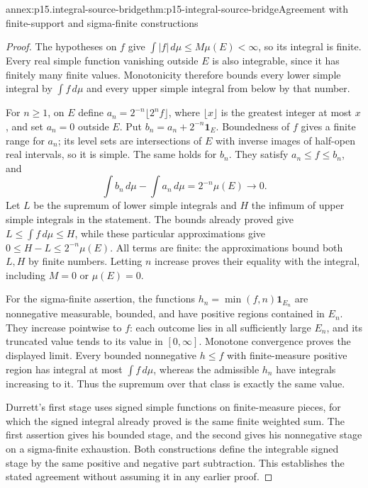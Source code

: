 \begin{annexitem}{annex:p15.integral-source-bridge}{thm:p15-integral-source-bridge}{Agreement with finite-support and sigma-finite constructions}
\begin{proof}
The hypotheses on \(f\) give
\(\int|f|\,d\mu\leq M\mu(E)<\infty\), so its integral is
finite. Every real simple function vanishing outside \(E\) is also
integrable, since it has finitely many finite values. Monotonicity
therefore bounds every lower simple integral by \(\int f\,d\mu\)
and every upper simple integral from below by that number.

For \(n\geq1\), on \(E\) define
\(a_n=2^{-n}\lfloor2^n f\rfloor\), where \(\lfloor x\rfloor\)
is the greatest integer at most \(x\), and set \(a_n=0\) outside
\(E\). Put \(b_n=a_n+2^{-n}\mathbf1_E\).
Boundedness of \(f\) gives a finite range for \(a_n\); its level
sets are intersections of \(E\) with inverse images of half-open
real intervals, so it is simple. The same holds for \(b_n\).
They satisfy \(a_n\leq f\leq b_n\), and
\[
 \int b_n\,d\mu-\int a_n\,d\mu=2^{-n}\mu(E)\longrightarrow0.
\]
Let \(L\) be the supremum of lower simple integrals and \(H\)
the infimum of upper simple integrals in the statement. The bounds
already proved give \(L\leq\int f\,d\mu\leq H\), while these
particular approximations give \(0\leq H-L\leq2^{-n}\mu(E)\).
All terms are finite: the approximations bound both \(L,H\) by
finite numbers. Letting \(n\) increase proves their equality with
the integral, including \(M=0\) or \(\mu(E)=0\).

For the sigma-finite assertion, the functions
\(h_n=\min(f,n)\mathbf1_{E_n}\) are nonnegative measurable,
bounded, and have positive regions contained in \(E_n\). They
increase pointwise to \(f\): each outcome lies in all sufficiently
large \(E_n\), and its truncated value tends to its value in
\([0,\infty]\). Monotone convergence proves the displayed limit.
Every bounded nonnegative \(h\leq f\) with finite-measure positive
region has integral at most \(\int f\,d\mu\), whereas the
admissible \(h_n\) have integrals increasing to it. Thus the
supremum over that class is exactly the same value.

Durrett's first stage uses signed simple functions on finite-measure
pieces, for which the signed integral already proved is the same finite
weighted sum. The first assertion gives his bounded stage, and the
second gives his nonnegative stage on a sigma-finite exhaustion. Both
constructions define the integrable signed stage by the same positive
and negative part subtraction. This establishes the stated agreement
without assuming it in any earlier proof.
\end{proof}
\end{annexitem}

